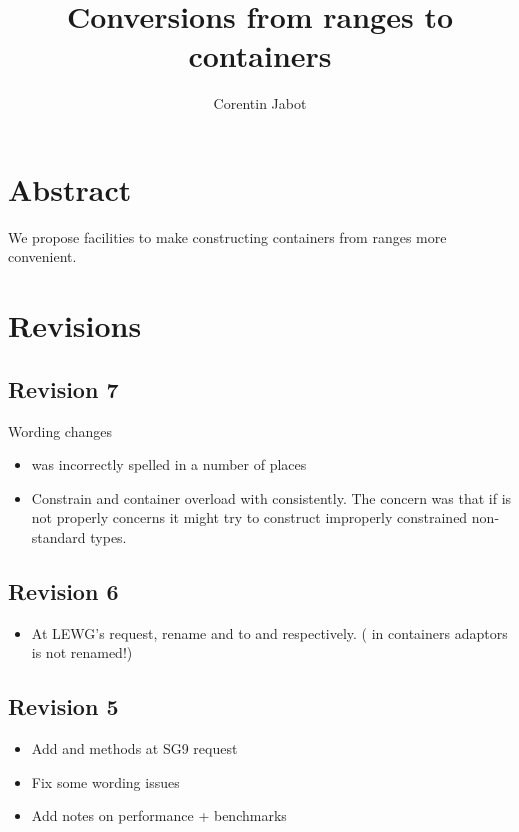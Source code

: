\documentclass{wg21}
\title{Conversions from ranges to containers}
\author{Corentin Jabot}{corentin.jabot@gmail.com}
\begin{document}
\maketitle

\section{Abstract}

We propose facilities to make constructing containers from ranges more convenient.

\section{Revisions}

\subsection*{Revision 7}
Wording changes
\begin{itemize}
    \item {} was incorrectly spelled in a number of places
    \item Constrain  and container  overload with  consistently. The concern was that
    if  is not properly concerns it might try to construct improperly constrained non-standard types.
\end{itemize}

\subsection*{Revision 6}
\begin{itemize}
    \item At LEWG's request, rename  and  to  and  respectively.
    ( in containers adaptors is not renamed!)
\end{itemize}


\subsection*{Revision 5}
\begin{itemize}
    \item Add  and  methods at SG9 request
    \item Fix some wording issues
    \item Add notes on performance + benchmarks
\end{itemize}
\end{document}

